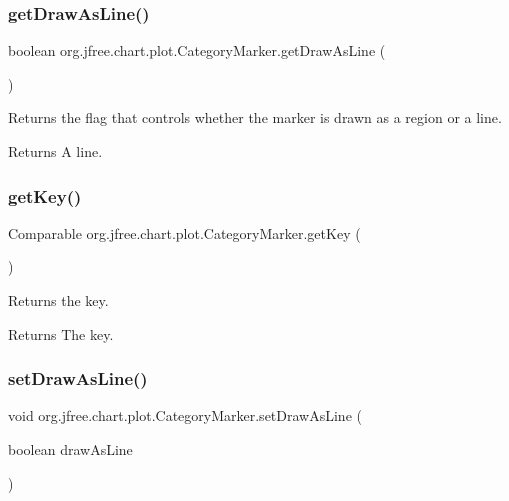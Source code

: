 \subsubsection{\texorpdfstring{get\+Draw\+As\+Line()}{getDrawAsLine()}}
{\footnotesize\ttfamily boolean org.\+jfree.\+chart.\+plot.\+Category\+Marker.\+get\+Draw\+As\+Line (\begin{DoxyParamCaption}{ }\end{DoxyParamCaption})}

Returns the flag that controls whether the marker is drawn as a region or a line.

\begin{DoxyReturn}{Returns}
A line. 
\end{DoxyReturn}
\mbox{\label{classorg_1_1jfree_1_1chart_1_1plot_1_1_category_marker_ab648c3388fd7fbd313696648b42623fd}} 
\subsubsection{\texorpdfstring{get\+Key()}{getKey()}}
{\footnotesize\ttfamily Comparable org.\+jfree.\+chart.\+plot.\+Category\+Marker.\+get\+Key (\begin{DoxyParamCaption}{ }\end{DoxyParamCaption})}

Returns the key.

\begin{DoxyReturn}{Returns}
The key. 
\end{DoxyReturn}
\mbox{\label{classorg_1_1jfree_1_1chart_1_1plot_1_1_category_marker_a6fdcb06485ceec2d647dbab584270e8f}} 
\subsubsection{\texorpdfstring{set\+Draw\+As\+Line()}{setDrawAsLine()}}
{\footnotesize\ttfamily void org.\+jfree.\+chart.\+plot.\+Category\+Marker.\+set\+Draw\+As\+Line (\begin{DoxyParamCaption}\item[{boolean}]{draw\+As\+Line }\end{DoxyParamCaption})}

